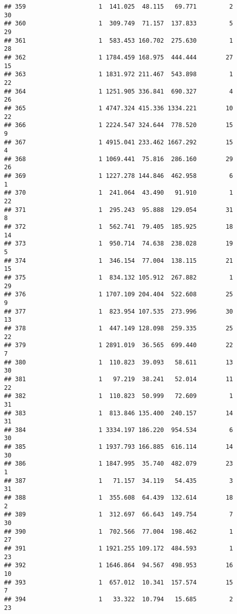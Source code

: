 \documentclass[
]{article}
\begin{document}
\begin{verbatim}
## 359                    1  141.025  48.115   69.771         2        30
## 360                    1  309.749  71.157  137.833         5        29
## 361                    1  583.453 160.702  275.630         1        28
## 362                    1 1784.459 168.975  444.444        27        15
## 363                    1 1831.972 211.467  543.898         1        22
## 364                    1 1251.905 336.841  690.327         4        26
## 365                    1 4747.324 415.336 1334.221        10        22
## 366                    1 2224.547 324.644  778.520        15         9
## 367                    1 4915.041 233.462 1667.292        15         4
## 368                    1 1069.441  75.816  286.160        29        26
## 369                    1 1227.278 144.846  462.958         6         1
## 370                    1  241.064  43.490   91.910         1        22
## 371                    1  295.243  95.888  129.054        31         8
## 372                    1  562.741  79.405  185.925        18        14
## 373                    1  950.714  74.638  238.028        19         5
## 374                    1  346.154  77.004  138.115        21        15
## 375                    1  834.132 105.912  267.882         1        29
## 376                    1 1707.109 204.404  522.608        25         9
## 377                    1  823.954 107.535  273.996        30        13
## 378                    1  447.149 128.098  259.335        25        22
## 379                    1 2891.019  36.565  699.440        22         7
## 380                    1  110.823  39.093   58.611        13        30
## 381                    1   97.219  38.241   52.014        11        22
## 382                    1  110.823  50.999   72.609         1        31
## 383                    1  813.846 135.400  240.157        14        31
## 384                    1 3334.197 186.220  954.534         6        30
## 385                    1 1937.793 166.885  616.114        14        30
## 386                    1 1847.995  35.740  482.079        23         1
## 387                    1   71.157  34.119   54.435         3        31
## 388                    1  355.608  64.439  132.614        18         2
## 389                    1  312.697  66.643  149.754         7        30
## 390                    1  702.566  77.004  198.462         1        27
## 391                    1 1921.255 109.172  484.593         1        23
## 392                    1 1646.864  94.567  498.953        16        10
## 393                    1  657.012  10.341  157.574        15         7
## 394                    1   33.322  10.794   15.685         2        23

\end{verbatim}
\end{document}

